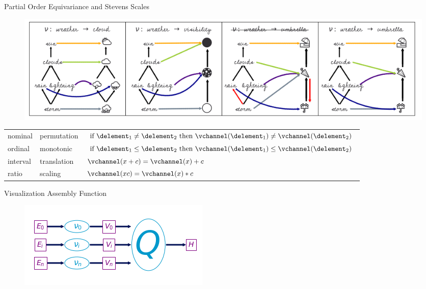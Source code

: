 \documentclass[xcolor={dvipsnames}, handout]{beamer}
\begin{document}
\begin{frame}{Partial Order Equivariance and Stevens Scales \cite{stevensTheoryScalesMeasurement1946}}
    \begin{figure}
        \includegraphics[width=1\textwidth]{figures/math/monoid_equivariant.png}
    \end{figure}

\begin{table}[H]
    \begin{tabulary}{\textwidth}{llL}
        nominal & permutation &  $\text{if } \delement_1 \neq \delement_2 \text{ then } \vchannel (\delement_1) \neq\vchannel(\delement_2)$\\
        ordinal &  monotonic & $\text{if } \delement_1 \leq \delement_2 \text{ then } \vchannel (\delement_1) \leq \vchannel(\delement_2)$\\
        interval &  translation &  $\vchannel (x + c) = \vchannel(x) + c$ \\
        ratio &  scaling &  $\vchannel(xc) = \vchannel(x)*c $
    \end{tabulary}
\end{table}
\end{frame}


\begin{frame}{Visualization Assembly Function}
    \begin{figure}
        \includegraphics[width=\textwidth]{figures/math/path_of_q.png}
    \end{figure}
\end{frame}
\end{document}
